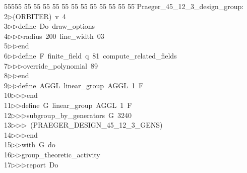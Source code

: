 %
%
\begin{tabbing}
55555 \= 55 \= 55 \= 55 \= 55 \= 55 \= 55 \= 55 \= 55 \= 55 \= 55 \= 55 \= 55 \= \>Praeger\_45\_12\_3\_design\_group:\\[0pt]
2\>$\triangleright$\>(ORBITER)\ v\ 4\ \\[0pt]
3\>$\triangleright$\>$\triangleright$\>define\ Do\ draw\_options\ \\[0pt]
4\>$\triangleright$\>$\triangleright$\>$\triangleright$\>radius\ 200\ line\_width\ 03\ \\[0pt]
5\>$\triangleright$\>$\triangleright$\>end\ \\[0pt]
6\>$\triangleright$\>$\triangleright$\>define\ F\ finite\_field\ q\ 81\ compute\_related\_fields\ \\[0pt]
7\>$\triangleright$\>$\triangleright$\>$\triangleright$\>override\_polynomial\ 89\ \\[0pt]
8\>$\triangleright$\>$\triangleright$\>end\ \\[0pt]
9\>$\triangleright$\>$\triangleright$\>define\ AGGL\ linear\_group\ AGGL\ 1\ F\ \\[0pt]
10\>$\triangleright$\>$\triangleright$\>$\triangleright$\>end\ \\[0pt]
11\>$\triangleright$\>$\triangleright$\>define\ G\ linear\_group\ AGGL\ 1\ F\ \\[0pt]
12\>$\triangleright$\>$\triangleright$\>$\triangleright$\>subgroup\_by\_generators\ G\ 3240\ \\[0pt]
13\>$\triangleright$\>$\triangleright$\>$\triangleright$\ (PRAEGER\_DESIGN\_45\_12\_3\_GENS)\ \\[0pt]
14\>$\triangleright$\>$\triangleright$\>$\triangleright$\>end\ \\[0pt]
15\>$\triangleright$\>$\triangleright$\>with\ G\ do\ \\[0pt]
16\>$\triangleright$\>$\triangleright$\>group\_theoretic\_activity\ \\[0pt]
17\>$\triangleright$\>$\triangleright$\>$\triangleright$\>report\ Do\ \\[0pt]

\end{tabbing}
